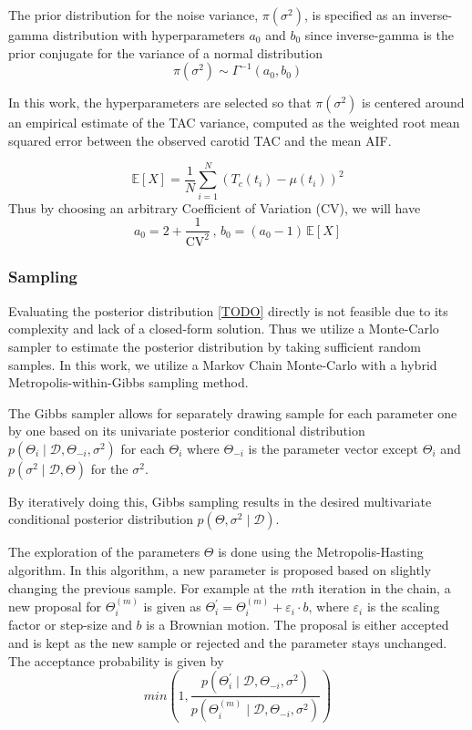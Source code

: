 The prior distribution for the noise variance, $\pi(\sigma^2)$, is specified as an inverse-gamma distribution with hyperparameters $a_0$ and $b_0$ since inverse-gamma is the prior conjugate for the variance of a normal distribution
\[
    \pi(\sigma^2) \sim \Gamma^{-1}(a_0,b_0)
\]

In this work, the hyperparameters are selected so that $\pi(\sigma^2)$ is centered around an empirical estimate of the TAC variance, computed as the weighted root mean squared error between the observed carotid TAC and the mean AIF.

\[
	\mathbb{E}[X] = \frac{1}{N} \sum_{i=1}^{N} (T_c(t_i) - \mu(t_i))^2
\]
Thus by choosing an arbitrary Coefficient of Variation (CV), we will have
\[
	a_0 = 2 + \frac{1}{\mathrm{CV}^2}\, , \, b_0 = (a_0 - 1) \, \mathbb{E}[X]
\]
\subsubsection{Sampling}

Evaluating the posterior distribution \ref{TODO} directly is not feasible due to its complexity and lack of a closed-form solution.
Thus we utilize a Monte-Carlo sampler to estimate the posterior distribution by taking sufficient random samples.
In this work, we utilize a Markov Chain Monte-Carlo with a hybrid Metropolis-within-Gibbs sampling method.

The Gibbs sampler allows for separately drawing sample for each parameter one by one based on its univariate posterior conditional distribution $p(\Theta_i \mid \mathcal{D}, \Theta_{-i}, \sigma^2)$ for each $\Theta_i$ where $\Theta_{-i}$ is the parameter vector except $\Theta_i$ and $p(\sigma^2 \mid \mathcal{D},\Theta)$ for the $\sigma^2$.

By iteratively doing this, Gibbs sampling results in the desired multivariate conditional posterior distribution $p(\Theta,\sigma^2 \mid \mathcal{D})$.

The exploration of the parameters $\Theta$ is done using the Metropolis-Hasting algorithm.
In this algorithm, a new parameter is proposed based on slightly changing the previous sample.
For example at the $m$th iteration in the chain, a new proposal for $\Theta_{i}^{(m)}$ is given as $\Theta_{i}^\prime = \Theta_{i}^{(m)} + \varepsilon_{i} \cdot b$, where $\varepsilon_{i}$ is the scaling factor or step-size and $b$ is a Brownian motion.
The proposal is either accepted and is kept as the new sample or rejected and the parameter stays unchanged.
The acceptance probability is given by
\[
	min\left(1,\frac{p(\Theta_i^\prime \mid \mathcal{D}, \Theta_{-i}, \sigma^2)}{p(\Theta_i^{(m)}\mid \mathcal{D}, \Theta_{-i}, \sigma^2)}\right)
\]

